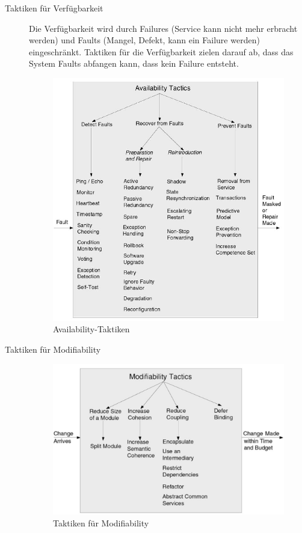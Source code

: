 \begin{description}
	\item[Taktiken für Verfügbarkeit] Die Verfügbarkeit wird durch Failures (Service kann nicht mehr erbracht werden) und Faults (Mangel, Defekt, kann ein Failure werden) eingeschränkt. Taktiken für die Verfügbarkeit zielen darauf ab, dass das System Faults abfangen kann, dass kein Failure entsteht.
	
	\begin{figure}[h!]
	\centering
	\includegraphics[width=0.7\linewidth]{fig/tactic-availability}
	\caption{Availability-Taktiken}
	\label{fig:tactic-availability}
	\end{figure}
	
	\item[Taktiken für Modifiability]
	\begin{figure}[h!]
	\centering
	\includegraphics[width=0.7\linewidth]{fig/tactic-modifability}
	\caption{Taktiken für Modifiability}
	\label{fig:tactic-modifability}
	\end{figure}


\end{description}
